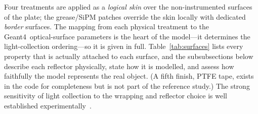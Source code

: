 \documentclass[11pt,a4paper]{article}
\newcommand{\gfour}{Geant4}
\begin{document}
Four treatments are applied as a \emph{logical skin} over the non-instrumented
surfaces of the plate; the grease/SiPM patches override the skin locally with
dedicated \emph{border} surfaces. The mapping from each physical treatment to the
\gfour\ optical-surface parameters is the heart of the model---it determines the
light-collection ordering---so it is given in full. Table~\ref{tab:surfaces}
lists every property that is actually attached to each surface, and the
subsubsections below describe each reflector physically, state how it is
modelled, and assess how faithfully the model represents the real object. (A
fifth finish, PTFE tape, exists in the code for completeness but is not part of
the reference study.) The strong sensitivity of light collection to the wrapping
and reflector choice is well established
experimentally~\cite{Taheri2017}.
\end{document}
